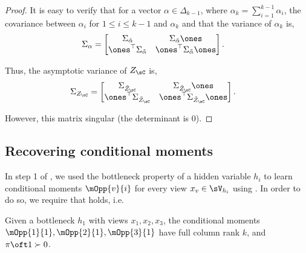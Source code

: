 \begin{proof}
It is easy to verify that for a vector $\alpha \in \Delta_{k-1}$, where
  $\alpha_k = \sum_{i=1}^{k-1} \alpha_i$, the covariance between
  $\alpha_i$ for $1 \le i \le k-1$ and $\alpha_k$ and that the variance
  of $\alpha_k$ is,
\begin{align*}
    \Sigma_{\alpha} &= 
    \begin{bmatrix}
    \Sigma_{\tilde \alpha} & \Sigma_{\tilde \alpha} \ones \\
    \ones^\top \Sigma_{\tilde \alpha} & \ones^\top \Sigma_{\tilde \alpha} \ones
    \end{bmatrix}.
\end{align*}

Thus, the asymptotic variance of $Z_\sC$ is,
\begin{align*}
    \Sigma_{Z_\sC} &= 
    \begin{bmatrix}
    \Sigma_{\tilde Z_\sC} & \Sigma_{\tilde Z_\sC} \ones \\
    \ones^\top \Sigma_{\tilde Z_\sC} & \ones^\top \Sigma_{\tilde Z_\sC} \ones
    \end{bmatrix}.
\end{align*}

However, this matrix singular (the determinant is $0$).

\end{proof}

\subsection{Recovering conditional moments}

In step 1 of \LearnMarginals, we used the bottleneck property of a hidden
  variable $h_i$ to learn conditional moments $\mOpp{v}{i}$ for every
  view $x_v \in \sV_{h_i}$ using \TensorFactorize. 
In order to do so, we require that  holds, i.e.
\begin{assumption*}[1]
  Given a bottleneck $h_1$ with views $x_1, x_2, x_3$, the conditional
  moments $\mOpp{1}{1}, \mOpp{2}{1}, \mOpp{3}{1}$ have full column rank
  $k$, and $\pi\oft 1 \succ 0$.
\end{assumption*}

